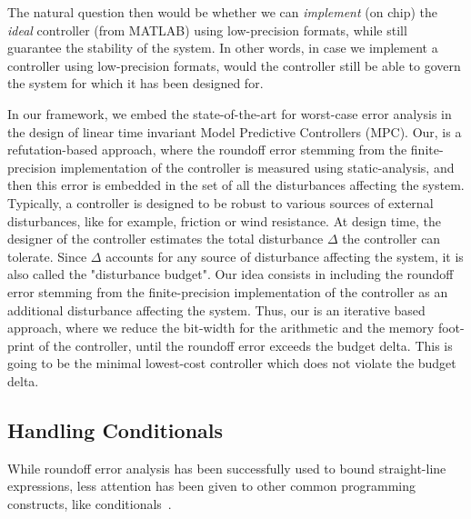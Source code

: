 The natural question then would be whether we can \emph{implement} (on chip) the \emph{ideal} controller (from MATLAB) using low-precision formats, while still guarantee the stability of the system.
%
In other words, in case we implement a controller using low-precision formats, would the controller still be able to govern the system for which it has been designed for.
%

In our framework, we embed the state-of-the-art for worst-case error analysis in the design of linear time invariant Model Predictive Controllers (MPC).
%
Our, is a refutation-based approach, where the roundoff error stemming from the finite-precision implementation of the controller is measured using static-analysis, and then this error is embedded in the set of all the disturbances affecting the system.
%
Typically, a controller is designed to be robust to various sources of external disturbances, like for example, friction or wind resistance.
%
At design time, the designer of the controller estimates the total disturbance $\Delta$ the controller can tolerate.
%
Since $\Delta$ accounts for any source of disturbance affecting the system, it is also called the "disturbance budget".
%
Our idea consists in including the roundoff error stemming from the finite-precision implementation of the controller as an additional disturbance affecting the system.
%
Thus, our is an iterative based approach, where we reduce the bit-width for the arithmetic and the memory foot-print of the controller, until the roundoff error exceeds the budget delta.
%
This is going to be the minimal lowest-cost controller which does not violate the budget delta. 
%

%
%  
%  
%
%
%
%

\subsection{Handling Conditionals}
%
%
While roundoff error analysis has been successfully used to bound straight-line expressions, less attention has been given to other common programming constructs, like conditionals~\cite{precisa, fluctuat}.
%

